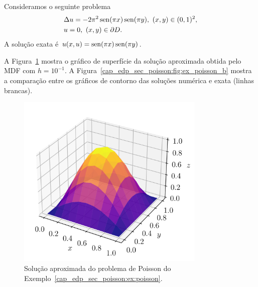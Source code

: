 \begin{ex}\label{cap_edp_sec_poisson:ex:poisson}
  Consideramos o seguinte problema
  \begin{subequations}
    \begin{align}
      &\Delta u = -2\pi^2\operatorname{sen}(\pi x)\operatorname{sen}(\pi y),~(x, y)\in (0, 1)^2,\\
      &u = 0, ~(x,y)\in\partial D.
    \end{align}
\end{subequations}
A solução exata é $u(x,u) = \operatorname{sen}(\pi x)\operatorname{sen}(\pi y)$.

A Figura~\ref{cap_edp_sec_poisson:fig:ex_poisson_a} mostra o gráfico de superfície da solução aproximada obtida pelo MDF com $h = 10^{-1}$. A Figura~\ref{cap_edp_sec_poisson:fig:ex_poisson_b} mostra a comparação entre os gráficos de contorno das soluções numérica e exata (linhas brancas).

\begin{figure}[H]
  \centering
  \includegraphics[width=0.8\textwidth]{./cap_edp/dados/fig_ex_poisson/fig_surface}
  \caption{Solução aproximada do problema de Poisson do Exemplo~\ref{cap_edp_sec_poisson:ex:poisson}.}
  \label{cap_edp_sec_poisson:fig:ex_poisson_a}
\end{figure}


\end{ex}
